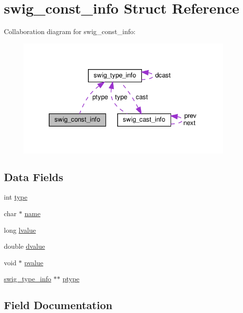 \hypertarget{structswig__const__info}{}\section{swig\+\_\+const\+\_\+info Struct Reference}
\label{structswig__const__info}


Collaboration diagram for swig\+\_\+const\+\_\+info\+:\nopagebreak
\begin{figure}[H]
\begin{center}
\leavevmode
\includegraphics[width=308pt]{structswig__const__info__coll__graph}
\end{center}
\end{figure}
\subsection*{Data Fields}
\begin{DoxyCompactItemize}
\item 
int \hyperlink{structswig__const__info_ae8bbc99e1cda11f24e306365cbf33893}{type}
\item 
char $\ast$ \hyperlink{structswig__const__info_aad383d74116313cf9a8532e163368050}{name}
\item 
long \hyperlink{structswig__const__info_af142e4c21ad4fe61f6c2624bff034583}{lvalue}
\item 
double \hyperlink{structswig__const__info_a74e477f1dbf515bcb7e2ef07a1d34c35}{dvalue}
\item 
void $\ast$ \hyperlink{structswig__const__info_abbc43512c364bff11fac5961c1155090}{pvalue}
\item 
\hyperlink{structswig__type__info}{swig\+\_\+type\+\_\+info} $\ast$$\ast$ \hyperlink{structswig__const__info_aedd46d173c5b5ed4ee60ad5660233557}{ptype}
\end{DoxyCompactItemize}


\subsection{Field Documentation}
\mbox{\label{structswig__const__info_a74e477f1dbf515bcb7e2ef07a1d34c35}} 
